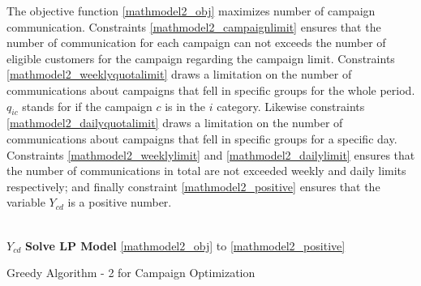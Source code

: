 \documentclass[11pt]{article}
\begin{document}
The objective function \eqref{mathmodel2_obj} maximizes number of campaign communication. Constraints \eqref{mathmodel2_campaignlimit} ensures that the number of communication for each campaign can not exceeds the number of eligible customers for the campaign regarding the campaign limit. Constraints \eqref{mathmodel2_weeklyquotalimit} draws a limitation on the number of communications about campaigns that fell in specific groups for the whole period. $q_{{i}{c}}$ stands for if the campaign $c$ is in the $i$ category. Likewise constraints \eqref{mathmodel2_dailyquotalimit} draws a limitation on the number of communications about campaigns that fell in specific groups for a specific day. Constraints \eqref{mathmodel2_weeklylimit} and \eqref{mathmodel2_dailylimit} ensures that the number of communications in total are not exceeded weekly and daily limits respectively; and finally constraint \eqref{mathmodel2_positive} ensures that the variable $Y_{{c}{d}}$ is a positive number.\\


\begin{algorithm}[H]
\\
$Y_{{c}{d}}$ \gets \textbf{Solve LP Model} \eqref{mathmodel2_obj} to \eqref{mathmodel2_positive}
\\
\;
\caption{Greedy Algorithm - 2 for Campaign Optimization}
\label{algo:change}
\end{algorithm}\\
\end{document}
